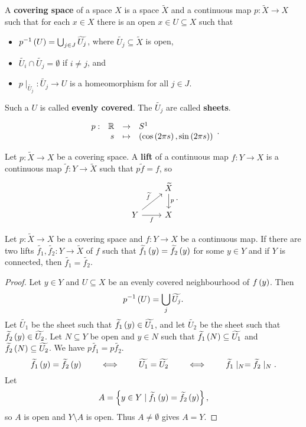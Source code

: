 \begin{definition*}
A \textbf{covering space} of a space $ X $ is a space $ \widetilde{X} $ and a continuous map $ p : \widetilde{X} \to X $ such that for each $ x \in X $ there is an open $ x \in U \subseteq X $ such that
\begin{itemize}
\item $ p^{-1}\left( U \right) = \bigcup_{j \in J} \widetilde{U_j} $, where $ \widetilde{U_j} \subseteq \widetilde{X} $ is open,
\item $ \widetilde{U_i} \cap \widetilde{U_j} = \emptyset $ if $ i \ne j $, and
\item $ p \mid_{\widetilde{U_j}} : \widetilde{U_j} \to U $ is a homeomorphism for all $ j \in J $.
\end{itemize}
Such a $ U $ is called \textbf{evenly covered}. The $ \widetilde{U_j} $ are called \textbf{sheets}.
\end{definition*}

\begin{example*}
$$ \function[p]{\R}{S^1}{s}{\rb{\cos\rb{2\pi s}, \sin\rb{2\pi s}}}. $$
\end{example*}

\begin{definition*}
Let $ p : \widetilde{X} \to X $ be a covering space. A \textbf{lift} of a continuous map $ f : Y \to X $ is a continuous map $ \widetilde{f} : Y \to \widetilde{X} $ such that $ p\widetilde{f} = f $, so
$$
\begin{tikzcd}
& \widetilde{X} \arrow{d}{p} \\
Y \arrow{ur}{\widetilde{f}} \arrow[swap]{r}{f} & X
\end{tikzcd}.
$$
\end{definition*}

\begin{proposition}
\label{prop:1.34}
Let $ p : \widetilde{X} \to X $ be a covering space and $ f : Y \to X $ be a continuous map. If there are two lifts $ \widetilde{f_1}, \widetilde{f_2} : Y \to \widetilde{X} $ of $ f $ such that $ \widetilde{f_1}\left( y \right) = \widetilde{f_2}\left( y \right) $ for some $ y \in Y $ and if $ Y $ is connected, then $ \widetilde{f_1} = \widetilde{f_2} $.
\end{proposition}

\begin{proof}
Let $ y \in Y $ and $ U \subseteq X $ be an evenly covered neighbourhood of $ f\left( y \right) $. Then
$$ p^{-1}\left( U \right) = \bigcup_j \widetilde{U_j}. $$
Let $ \widetilde{U_1} $ be the sheet such that $ \widetilde{f_1}\left( y \right) \in \widetilde{U_1} $, and let $ \widetilde{U_2} $ be the sheet such that $ \widetilde{f_2}\left( y \right) \in \widetilde{U_2} $. Let $ N \subseteq Y $ be open and $ y \in N $ such that $ \widetilde{f_1}\left( N \right) \subseteq \widetilde{U_1} $ and $ \widetilde{f_2}\left( N \right) \subseteq \widetilde{U_2} $. We have $ p\widetilde{f_1} = p\widetilde{f_2} $.
$$ \widetilde{f_1}\left( y \right) = \widetilde{f_2}\left( y \right) \qquad \iff \qquad \widetilde{U_1} = \widetilde{U_2} \qquad \iff \qquad \widetilde{f_1} \mid_N = \widetilde{f_2} \mid_N. $$
Let
$$ A = \left\{ y \in Y \mid \widetilde{f_1}\left( y \right) = \widetilde{f_2}\left( y \right) \right\}, $$
so $ A $ is open and $ Y \setminus A $ is open. Thus $ A \ne \emptyset $ gives $ A = Y $.
\end{proof}

